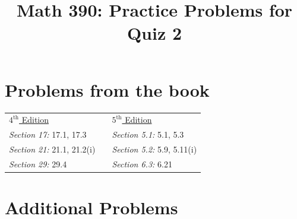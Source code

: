 \documentclass{article}
\title{Math 390: Practice Problems for Quiz 2}
\author{}
\date{}
\begin{document}

\maketitle

\setlength{\parindent}{0em} %
\setlength{\parskip}{1em} %


\section*{Problems from the book}
\begin{center}
\begin{tabular}{lll}
	\underline{$4^{\text{th}}$ Edition} & & \underline{$5^{\text{th}}$ Edition} \\
	{ \it Section 17:} 17.1, 17.3 & & { \it Section 5.1:} 5.1, 5.3 \\
	{ \it Section 21:} 21.1, 21.2(i) & & { \it Section 5.2:} 5.9, 5.11(i) \\
	{ \it Section 29:} 29.4 & & { \it Section 6.3:} 6.21
\end{tabular}
\end{center}

\section*{Additional Problems}
\end{document}
